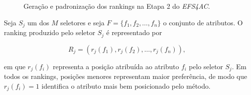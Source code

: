 \begin{figure}[ht]

    \caption{Geração e padronização dos rankings na Etapa 2 do
    \textit{EFS4AC}.}
    \label{fig:geracao-rankings-ac-efs}
\end{figure}

Seja $S_j$ um dos $M$ seletores e seja
$F=\{f_1,f_2,\ldots,f_n\}$ o conjunto de atributos. O ranking produzido pelo
seletor $S_j$ é representado por

\begin{equation}
    R_j =
    \left(
        r_j(f_1),
        r_j(f_2),
        \ldots,
        r_j(f_n)
    \right),
    \label{eq:ranking-individual-ac-efs}
\end{equation}

em que $r_j(f_i)$ representa a posição atribuída ao atributo $f_i$ pelo
seletor $S_j$. Em todos os rankings, posições menores representam maior
preferência, de modo que $r_j(f_i)=1$ identifica o atributo mais bem
posicionado pelo método.


